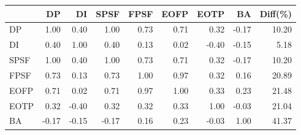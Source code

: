 \begin{tabular}{l|rrrrrrr|r}
\toprule
 & DP & DI & SPSF & FPSF & EOFP & EOTP & BA & Diff(\%)  \\
\midrule
DP & 1.00 & 0.40 & 1.00 & 0.73 & 0.71 & 0.32 & -0.17 & 10.20  \\
DI & 0.40 & 1.00 & 0.40 & 0.13 & 0.02 & -0.40 & -0.15 & 5.18  \\
SPSF & 1.00 & 0.40 & 1.00 & 0.73 & 0.71 & 0.32 & -0.17 & 10.20  \\
FPSF & 0.73 & 0.13 & 0.73 & 1.00 & 0.97 & 0.32 & 0.16 & 20.89  \\
EOFP & 0.71 & 0.02 & 0.71 & 0.97 & 1.00 & 0.33 & 0.23 & 21.48  \\
EOTP & 0.32 & -0.40 & 0.32 & 0.32 & 0.33 & 1.00 & -0.03 & 21.04  \\
BA & -0.17 & -0.15 & -0.17 & 0.16 & 0.23 & -0.03 & 1.00 & 41.37  \\
\bottomrule
\end{tabular}

